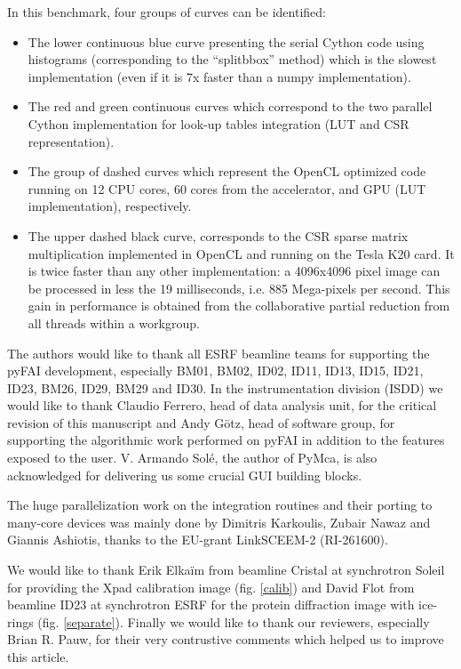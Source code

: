 \documentclass{iucr}
\begin{document}
In this benchmark, four groups of curves can be identified:
\begin{itemize}
  \item The lower continuous blue curve presenting the serial Cython code using
  histograms (corresponding to the ``splitbbox'' method) which is the slowest
  implementation (even if it is 7x faster than a numpy implementation).
  \item The red and green continuous curves which correspond to the two parallel
  Cython implementation for look-up tables integration (LUT and CSR
  representation).
  \item The group of dashed curves which represent the OpenCL optimized code
  running on 12 CPU cores, 60 cores from the accelerator, and GPU (LUT
  implementation), respectively.
  \item The upper dashed black curve, corresponds to the CSR sparse matrix
  multiplication implemented in OpenCL and running on the Tesla K20 card.
  It is twice faster than any other implementation: a 4096x4096 pixel
  image can be processed in less the 19 milliseconds, i.e. 885 Mega-pixels
  per second.
  This gain in performance is obtained from the collaborative
  partial reduction from all threads within a workgroup.
\end{itemize}



The authors would like to thank all ESRF beamline teams for supporting the
pyFAI development, especially BM01, BM02, ID02, ID11, ID13, ID15, ID21, ID23,
BM26, ID29, BM29 and ID30.
In the instrumentation division (ISDD) we would like to thank Claudio
Ferrero, head of data analysis unit, for the critical revision of this
manuscript and Andy G\"otz, head of software group, for supporting the
algorithmic work performed on pyFAI in addition to the features exposed to the
user.
V. Armando Solé, the author of PyMca, is also acknowledged for delivering us
some crucial GUI building blocks.

The huge parallelization work on the integration routines and their porting to
many-core devices was mainly done by Dimitris Karkoulis, Zubair Nawaz and Giannis Ashiotis,
thanks to the EU-grant LinkSCEEM-2 (RI-261600).

We would like to thank 
Erik Elka\"im from beamline Cristal at synchrotron Soleil for providing the Xpad   
calibration image (fig. \ref{calib}) and David Flot from beamline ID23 at
synchrotron ESRF for the protein diffraction image with ice-rings (fig.
\ref{separate}).
Finally we would like to thank our reviewers, especially Brian R. Pauw, for
their very contrustive comments which helped us to improve this article. 
\end{document}
